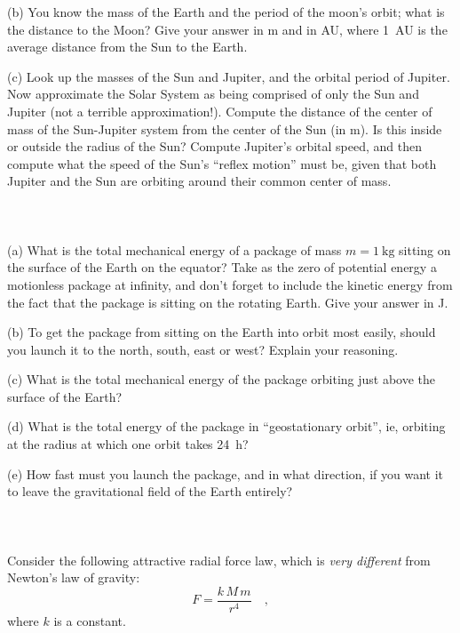 \documentclass[12pt]{article}
\newcounter{problem}
\begin{document}
(b) You know the mass of the Earth and the period of the moon's orbit;
what is the distance to the Moon?  Give your answer in m and in AU,
where 1~AU is the average distance from the Sun to the Earth.

(c) Look up the masses of the Sun and Jupiter, and the orbital period
of Jupiter.  Now approximate the Solar System as being comprised of
only the Sun and Jupiter (not a terrible approximation!).  Compute the
distance of the center of mass of the Sun-Jupiter system from the
center of the Sun (in m).  Is this inside or outside the radius of the
Sun?  Compute Jupiter's orbital speed, and then compute what the speed
of the Sun's ``reflex motion'' must be, given that both Jupiter and
the Sun are orbiting around their common center of mass.

\paragraph{\problemname~\theproblem}

(a) What is the total mechanical energy of a package of mass $m=
1~\mathrm{kg}$ sitting on the surface of the Earth on the equator?
Take as the zero of potential energy a motionless package at infinity,
and don't forget to include the kinetic energy from the fact that the
package is sitting on the rotating Earth.  Give your answer in J.

(b) To get the package from sitting on the Earth into orbit most
easily, should you launch it to the north, south, east or west?
Explain your reasoning.

(c) What is the total mechanical energy of the package orbiting just
above the surface of the Earth? 

(d) What is the total energy of the package in ``geostationary
orbit'', ie, orbiting at the radius at which one orbit takes 24~h?

(e) How fast must you launch the package, and in what direction, if
you want it to leave the gravitational field of the Earth entirely?

\paragraph{\problemname~\theproblem}

Consider the following attractive radial force law, which is
\emph{very different} from Newton's law of gravity:
\begin{equation}
F = \frac{k\,M\,m}{r^4} \quad ,
\end{equation}
where $k$ is a constant.
\end{document}
